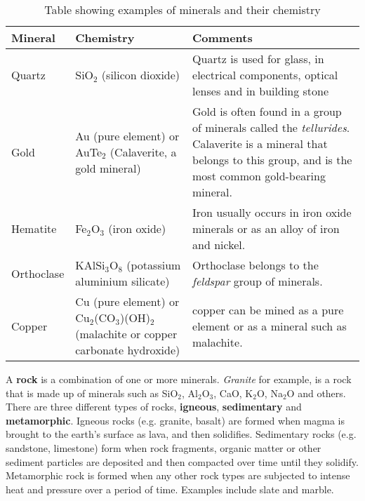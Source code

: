 \begin{table}[H]
\begin{center}
\caption{Table showing examples of minerals and their chemistry}
\label{tab:minerals}
\begin{tabular}{|l|p{3.5cm}|p{6.5cm}|}\hline
\textbf{Mineral} & \textbf{Chemistry} & \textbf{Comments}\\\hline
Quartz & SiO$_{2}$ (silicon dioxide) & Quartz is used for glass, in electrical components, optical lenses and in building stone \\\hline
Gold & Au (pure element) or AuTe$_{2}$ (Calaverite, a gold mineral) & Gold is often found in a group of minerals called the \textit{tellurides}. Calaverite is a mineral that belongs to this group, and is the most common gold-bearing mineral. \\\hline
Hematite & Fe$_{2}$O$_{3}$ (iron oxide) & Iron usually occurs in iron oxide minerals or as an alloy of iron and nickel. \\\hline
Orthoclase & KAlSi$_{3}$O$_{8}$ (potassium aluminium silicate) & Orthoclase belongs to the \textit{feldspar} group of minerals. \\\hline
Copper & Cu (pure element) or Cu$_{2}$(CO$_{3}$)(OH)$_{2}$ (malachite or copper carbonate hydroxide) & copper can be mined as a pure element or as a mineral such as malachite. \\\hline
\end{tabular}
\end{center}
\end{table}


A \textbf{rock} is a combination of one or more minerals. \textit{Granite} for example, is a rock that is made up of minerals such as SiO$_{2}$, Al$_{2}$O$_{3}$, CaO, K$_{2}$O, Na$_{2}$O and others. There are three different types of rocks, \textbf{igneous}, \textbf{sedimentary} and \textbf{metamorphic}. Igneous rocks (e.g.\@{} granite, basalt) are formed when magma is brought to the earth's surface as lava, and then solidifies. Sedimentary rocks (e.g.\@{} sandstone, limestone) form when rock fragments, organic matter or other sediment particles are deposited and then compacted over time until they solidify. Metamorphic rock is formed when any other rock types are subjected to intense heat and pressure over a period of time. Examples include slate and marble.\\


